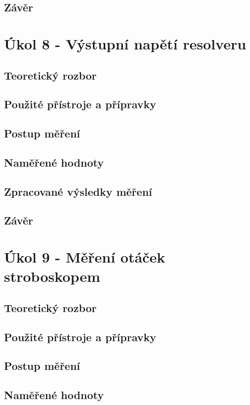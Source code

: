 \documentclass{protokol}
\begin{document}
    \subsection{Závěr}

\pagebreak
\section{Úkol 8 - Výstupní napětí resolveru}
    \subsection{Teoretický rozbor}
    \subsection{Použité přístroje a přípravky}
    \subsection{Postup měření}
    \subsection{Naměřené hodnoty}
    \subsection{Zpracované výsledky měření}
    \subsection{Závěr}

\pagebreak


\section{Úkol 9 - Měření otáček stroboskopem}
    \subsection{Teoretický rozbor}
    \subsection{Použité přístroje a přípravky}
    \subsection{Postup měření}
    \subsection{Naměřené hodnoty}
\end{document}
